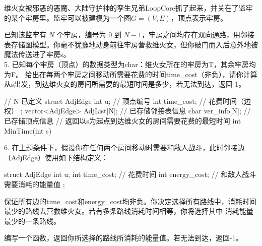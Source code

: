 \begin{exercise}
维火女被邪恶的恶魔、大陆守护神的孪生兄弟LoopCore抓了起来，并关在了监牢的某个牢房里。监牢可以被建模为一个图$G=(V,E)$，顶点表示牢房。

已知该监牢有 $N$ 个牢房，编号为 0 到 $N-1$，牢房之间均存在双向通路，用邻接表存储图模型。你毫不犹豫地动身前往牢房营救维火女，但你破门而入后意外地被魔法传送进了牢房s。\\

5. 已知每个牢房（顶点）的数据类型为char：维火女所在的牢房为\textquotesingle T\textquotesingle，其余牢房均为\textquotesingle F\textquotesingle。
给出在每两个牢房之间移动所需要花费的时间time\_cost（非负），请你计算从s出发，到达维火女的房间所需要的最短时间是多少，若无法到达，返回-1。

\begin{cppcode}
    // N 已定义
    struct AdjEdge {
        int u;          // 顶点编号
        int time_cost;  // 花费时间（边权）
    };
    vector<AdjEdge> AdjList[N];    // 已存储邻接表信息 
    char ver_info[N];   // 已存储顶点信息
    // 返回以s为起点到达维火女的房间需要花费的最短时间
    int MinTime(int s) {
        
    }
\end{cppcode}

\vspace{\baselineskip}

6. 在{\color{red}上题}条件下，假设你在任何两个房间移动时需要和敌人战斗，此时邻接边（AdjEdge）使用如下结构定义：
\begin{cppcode}
    struct AdjEdge {
        int u;              
        int time_cost;      // 花费时间
        int energy_cost;    // 和敌人战斗需要消耗的能量值
    };
\end{cppcode}
保证所有边的time\_cost和energy\_cost均非负。你决定选择所有路线中，消耗时间最少的路线去营救维火女。若有多条路线消耗时间相等，你将选择其中
消耗能量最少的一条路线。

编写一个函数，返回你所选择的路线所消耗的能量值。若无法到达，返回-1。\\


        



\end{exercise}
\clearpage

